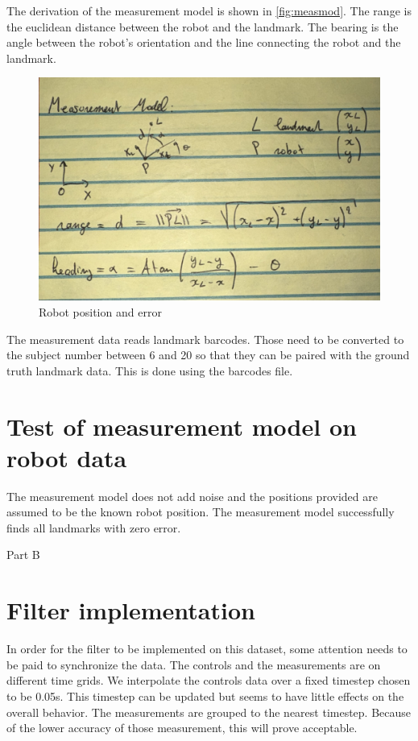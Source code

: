 \documentclass{article}
\begin{document}
The derivation of the measurement model is shown in \autoref{fig:measmod}. The range is the euclidean distance between the robot and the landmark. The bearing is the angle between the robot's orientation and the line connecting the robot and the landmark.

\begin{figure}
\centering
\includegraphics[scale=0.3]{measurement_model.jpeg}
\caption{Robot position and error}
\label{fig:measmod}
\end{figure}

The measurement data reads landmark barcodes. Those need to be converted to the subject number between 6 and 20 so that they can be paired with the ground truth landmark data. This is done using the barcodes file.



\section{Test of measurement model on robot data}
The measurement model does not add noise and the positions provided are assumed to be the known robot position. The measurement model successfully finds all landmarks with zero error.

\vspace{1cm}
\large{Part B}
\normalsize{}

\section{Filter implementation}

In order for the filter to be implemented on this dataset, some attention needs to be paid to synchronize the data. The controls and the measurements are on different time grids. We interpolate the controls data over a fixed timestep chosen to be 0.05s. This timestep can be updated but seems to have little effects on the overall behavior. The measurements are grouped to the nearest timestep. Because of the lower accuracy of those measurement, this will prove acceptable.
\end{document}
